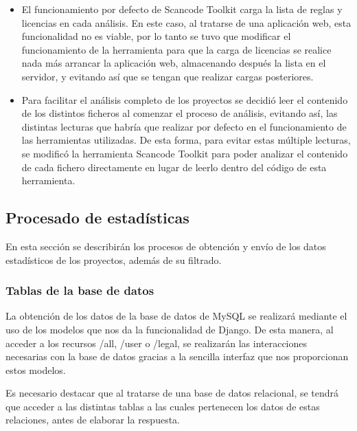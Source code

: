 \documentclass[a4paper, spanish, 12pt]{book}
\begin{document}
\begin{itemize}
\item El funcionamiento por defecto de Scancode Toolkit carga la lista de reglas
y licencias en cada an\'alisis. En este caso, al tratarse de una aplicaci\'on web,
esta funcionalidad no es viable, por lo tanto se tuvo que modificar el
funcionamiento de la herramienta para que la carga de licencias se realice
nada m\'as arrancar la aplicaci\'on web, almacenando despu\'es la lista en el
servidor, y evitando as\'i que se tengan que realizar cargas posteriores.

\item Para facilitar el an\'alisis completo de los proyectos se decidi\'o leer
el contenido de los distintos ficheros al comenzar el proceso de an\'alisis,
evitando as\'i, las distintas lecturas que habr\'ia que realizar por defecto en el
funcionamiento de las herramientas utilizadas. De esta forma, para evitar estas
m\'ultiple lecturas, se modific\'o la herramienta Scancode Toolkit para poder
analizar el contenido de cada fichero directamente en lugar de leerlo dentro
del c\'odigo de esta herramienta.

\end{itemize}

\subsection{Procesado de estad\'isticas}
\label{subsec:statistics}

En esta secci\'on se describir\'an los procesos de obtenci\'on y env\'io de los datos
estad\'isticos de los proyectos, adem\'as de su filtrado.

\subsubsection*{Tablas de la base de datos}
\label{subsubsec:tablas_bd}

La obtenci\'on de los datos de la base de datos de MySQL se realizar\'a mediante
el uso de los modelos que nos da la funcionalidad de Django. De esta manera, al
acceder a los recursos /all, /user o /legal, se realizar\'an las interacciones
necesarias con la base de datos gracias a la sencilla interfaz que nos proporcionan
estos modelos.

Es necesario destacar que al tratarse de una base de datos relacional, se tendr\'a
que acceder a las distintas tablas a las cuales pertenecen los datos de estas
relaciones, antes de elaborar la respuesta.
\end{document}

